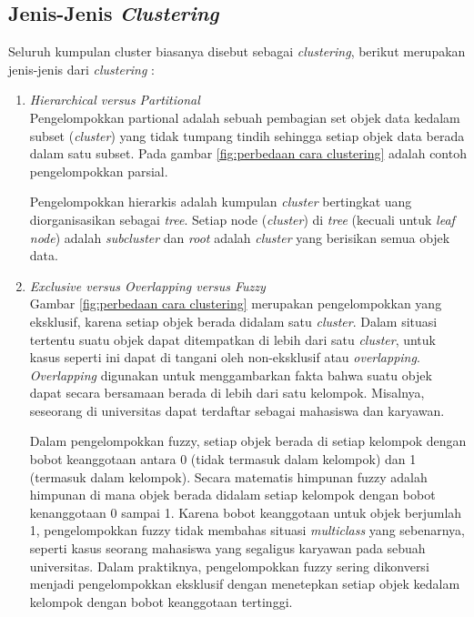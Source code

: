 \subsection{Jenis-Jenis \textit{Clustering}}
\label{subsec:jenis clustering}

Seluruh kumpulan cluster biasanya disebut sebagai \textit{clustering}, berikut merupakan jenis-jenis dari \textit{clustering} \cite{buku:data:mining} :

\begin{enumerate}
    \item \textit{Hierarchical versus Partitional} \\
        Pengelompokkan partional adalah sebuah pembagian set objek data kedalam subset (\textit{cluster}) yang tidak tumpang tindih sehingga setiap objek data berada dalam satu subset. Pada gambar \ref{fig:perbedaan cara clustering} adalah contoh pengelompokkan parsial.
        
        Pengelompokkan hierarkis adalah kumpulan \textit{cluster} bertingkat uang diorganisasikan sebagai \textit{tree}. Setiap node (\textit{cluster}) di \textit{tree} (kecuali untuk \textit{leaf node}) adalah \textit{subcluster} dan \textit{root} adalah \textit{cluster} yang berisikan semua objek data.
    
    \item \textit{Exclusive versus Overlapping versus Fuzzy} \\
        Gambar \ref{fig:perbedaan cara clustering} merupakan pengelompokkan yang eksklusif, karena setiap objek berada didalam satu \textit{cluster}. Dalam situasi tertentu suatu objek dapat ditempatkan di lebih dari satu \textit{cluster}, untuk kasus seperti ini dapat di tangani oleh non-eksklusif atau \textit{overlapping}. \textit{Overlapping} digunakan untuk menggambarkan fakta bahwa suatu objek dapat secara bersamaan berada di lebih dari satu kelompok. Misalnya, seseorang di universitas dapat terdaftar sebagai mahasiswa dan karyawan.
        
        Dalam pengelompokkan fuzzy, setiap objek berada di setiap kelompok dengan bobot keanggotaan antara 0 (tidak termasuk dalam kelompok) dan 1 (termasuk dalam kelompok). Secara matematis himpunan fuzzy adalah himpunan di mana objek berada didalam setiap kelompok dengan bobot kenanggotaan 0 sampai 1. Karena bobot keanggotaan untuk objek berjumlah 1, pengelompokkan fuzzy tidak membahas situasi \textit{multiclass} yang sebenarnya, seperti kasus seorang mahasiswa yang segaligus karyawan pada sebuah universitas. Dalam praktiknya, pengelompokkan fuzzy sering dikonversi menjadi pengelompokkan eksklusif dengan menetepkan setiap objek kedalam kelompok dengan bobot keanggotaan tertinggi.
        

\end{enumerate}
